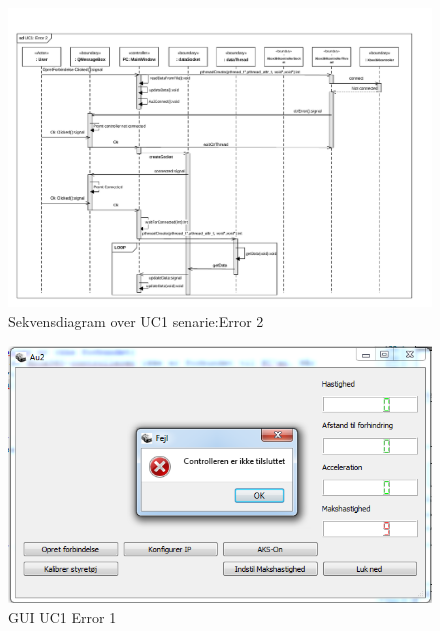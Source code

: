 \begin{figure}[H]
\centering
\includegraphics[width=\textwidth* 1,height=\textwidth* 1 ]{../fig/diagrammer/pc/sd_uc1_Error_2.pdf}
\caption{Sekvensdiagram over UC1 senarie:Error 2}
\label{fig:cd_uc1_error_2}
\end{figure}

\begin{figure}[H]
\centering
\includegraphics[width=\textwidth* 3/4,height=\textwidth* 9/20 ]{../fig/billeder/gui_uc1_error_2.png}
\caption{GUI UC1 Error 1}
\label{fig:GUI_uc1_error_2}
\end{figure}

